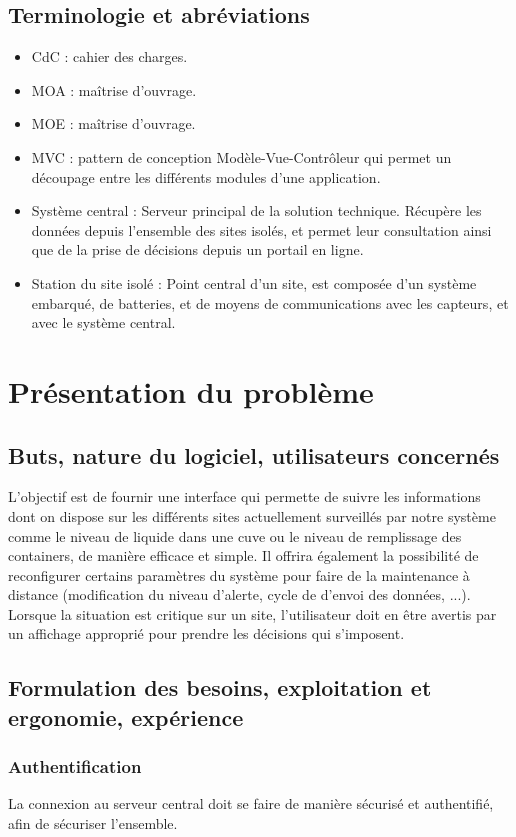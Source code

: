 \subsection{Terminologie et abréviations}
\begin{itemize}
	\item CdC : cahier des charges.
	\item MOA : maîtrise d'ouvrage.
	\item MOE : maîtrise d'ouvrage.
	\item MVC : pattern de conception Modèle-Vue-Contrôleur qui permet un découpage entre les différents modules d'une application.
	\item Système central : Serveur principal de la solution technique. Récupère les données depuis l'ensemble des sites isolés, et permet leur consultation ainsi que de la prise de décisions depuis un portail en ligne.
	\item Station du site isolé : Point central d'un site, est composée d'un système embarqué, de batteries, et de moyens de communications avec les capteurs, et avec le système central.
\end{itemize}

\section{Présentation du problème}
\subsection{Buts, nature du logiciel, utilisateurs concernés}
L'objectif est de fournir une interface qui permette de suivre les informations dont on dispose sur les différents sites actuellement surveillés par notre système comme le niveau de liquide dans une cuve ou le niveau de remplissage des containers, de manière efficace et simple. Il offrira également la possibilité de reconfigurer certains paramètres du système pour faire de la maintenance à distance (modification du niveau d'alerte, cycle de d'envoi des données, ...).
Lorsque la situation est critique sur un site, l'utilisateur doit en être avertis par un affichage approprié pour prendre les décisions qui s'imposent.

\subsection{Formulation des besoins, exploitation et ergonomie, expérience}

\subsubsection{Authentification}
La connexion au serveur central doit se faire de manière sécurisé et authentifié, afin de sécuriser l'ensemble.

